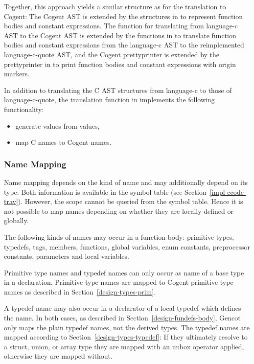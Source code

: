 Together, this approach yields a similar structure as for the translation to Cogent: The Cogent AST is extended 
by the structures in  to represent function bodies and constant expressions. The function for
translating from language-c AST to the Cogent AST is extended by the functions in  to
translate function bodies and constant expressions from the language-c AST to the reimplemented language-c-quote 
AST, and the Cogent prettyprinter is extended by the prettyprinter
in  to print function bodies and constant expressions with origin markers.

In addition to translating the C AST structures from language-c to those of language-c-quote, the translation
function in  implements the following functionality:
\begin{itemize}
\item generate  values from  values,
\item map C names to Cogent names.
\end{itemize}

\subsubsection{Name Mapping}

Name mapping depends on the kind of name and may additionally depend on its type. Both information is
available in the symbol table (see Section~\ref{impl-ccode-trav}). However, the scope cannot be queried
from the symbol table. Hence it is not possible to map names depending on whether they are locally defined
or globally.

The following kinds of names may occur in a function body: primitive types, typedefs, tags, members, 
functions, global variables, enum constants, preprocessor constants, parameters and local variables.

Primitive type names and typedef names can only occur as name of a base type in a declaration. Primitive
type names are mapped to Cogent primitive type names as described in Section~\ref{design-types-prim}.

A typedef name may also occur in a declarator of a local typedef which defines the name. 
In both cases, as described in Section~\ref{design-fundefs-body}, Gencot
only maps the plain typedef names, not the derived types. The typedef names are mapped according to
Section~\ref{design-types-typedef}: If they ultimately resolve to a struct, union, or array type they
are mapped with an unbox operator applied, otherwise they are mapped without.

